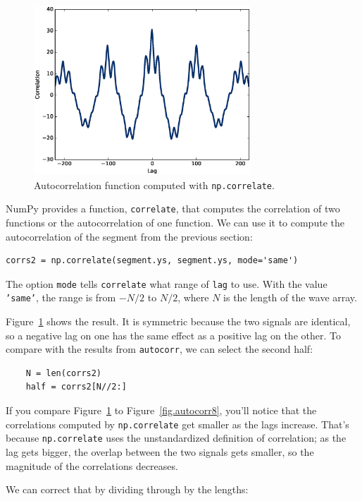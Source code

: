 \documentclass[12pt]{book}
\begin{document}
\begin{figure}
\centerline{\includegraphics[height=2.5in]{figs/autocorr9.eps}}
\caption{Autocorrelation function computed with {\tt np.correlate}.}
\label{fig.autocorr9}
\end{figure}

NumPy provides a function, {\tt correlate}, that computes
the correlation of two functions or the autocorrelation of one
function.  We can use it to compute the autocorrelation of
the segment from the previous section:

\begin{verbatim}
corrs2 = np.correlate(segment.ys, segment.ys, mode='same')
\end{verbatim}

The option {\tt mode} tells {\tt correlate} what range
of {\tt lag} to use.  With the value {\tt 'same'}, the
range is from $-N/2$ to $N/2$, where $N$ is the length of the
wave array.

Figure~\ref{fig.autocorr9} shows the result.  It is symmetric because
the two signals are identical, so a negative lag on one has the same
effect as a positive lag on the other.  To compare with the results
from {\tt autocorr}, we can select the second half:

\begin{verbatim}
    N = len(corrs2)
    half = corrs2[N//2:]
\end{verbatim}

If you compare Figure~\ref{fig.autocorr9} to Figure~\ref{fig.autocorr8},
you'll notice that the correlations computed by {\tt np.correlate}
get smaller as the lags increase.  That's because {\tt np.correlate}
uses the unstandardized definition of correlation;
as the lag gets bigger, the
overlap between the two signals gets smaller, so the magnitude of
the correlations decreases.

We can correct that by dividing through by the lengths:
\end{document}
